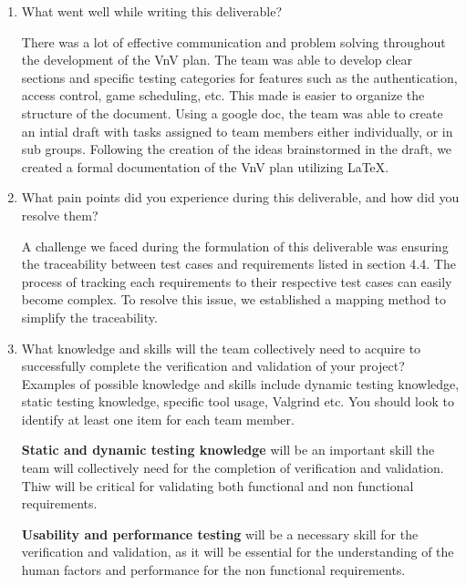 \documentclass[12pt, titlepage]{article}
\begin{document}
\begin{enumerate}
    \item What went well while writing this deliverable?

          There was a lot of effective communication and problem solving throughout the
          development of the VnV plan. The team was able to develop clear sections and
          specific testing categories for features such as the authentication, access
          control, game scheduling, etc. This made is easier to organize the structure
          of the document. Using a google doc, the team was able to create an intial
          draft with tasks assigned to team members either individually, or in sub groups.
          Following the creation of the ideas brainstormed in the draft, we created a
          formal documentation of the VnV plan utilizing LaTeX.

    \item What pain points did you experience during this deliverable, and how
          did you resolve them?

          A challenge we faced during the formulation of this deliverable was ensuring
          the traceability between test cases and requirements listed in section 4.4.
          The process of tracking each requirements to their respective test cases can
          easily become complex. To resolve this issue, we established a mapping method
          to simplify the traceability.

    \item What knowledge and skills will the team collectively need to acquire to
          successfully complete the verification and validation of your project?
          Examples of possible knowledge and skills include dynamic testing knowledge,
          static testing knowledge, specific tool usage, Valgrind etc.  You should look to
          identify at least one item for each team member.

          \textbf{Static and dynamic testing knowledge} will be an important skill the
          team will collectively need for the completion of verification and validation.
          Thiw will be critical for validating both functional and non functional
          requirements.

          \textbf{Usability and performance testing} will be a necessary skill for the
          verification and validation, as it will be essential for the understanding
          of the human factors and performance for the non functional requirements.


\end{enumerate}
\end{document}
